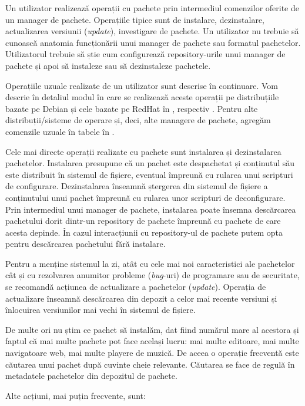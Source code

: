 Un utilizator realizează operații cu pachete prin intermediul comenzilor oferite de un manager de pachete.
Operațiile tipice sunt de instalare, dezinstalare, actualizarea versiunii (\textit{update}), investigare de pachete.
Un utilizator nu trebuie să cunoască anatomia funcționării unui manager de pachete sau formatul pachetelor.
Utilizatorul trebuie să știe cum configurează repository-urile unui manager de pachete și apoi să instaleze sau să dezinstaleze pachetele.

Operațiile uzuale realizate de un utilizator sunt descrise în continuare.
Vom descrie în detaliul modul în care se realizează aceste operații pe distribuțiile bazate pe Debian și cele bazate pe RedHat în , respectiv .
Pentru alte distribuții/sisteme de operare și, deci, alte managere de pachete, agregăm comenzile uzuale în tabele în .

Cele mai directe operații realizate cu pachete sunt instalarea și dezinstalarea pachetelor.
Instalarea presupune că un pachet este despachetat și conținutul său este distribuit în sistemul de fișiere, eventual împreună cu rularea unui scripturi de configurare.
Dezinstalarea înseamnă ștergerea din sistemul de fișiere a conținutului unui pachet împreună cu rularea unor scripturi de deconfigurare.
Prin intermediul unui manager de pachete, instalarea poate însemna descărcarea pachetului dorit dintr-un repository de pachete împreună cu pachete de care acesta depinde.
În cazul interacțiunii cu repository-ul de pachete putem opta pentru descărcarea pachetului fără instalare.

Pentru a menține sistemul la zi, atât cu cele mai noi caracteristici ale pachetelor cât și cu rezolvarea anumitor probleme (\textit{bug}-uri) de programare sau de securitate, se recomandă acțiunea de actualizare a pachetelor (\textit{update}).
Operația de actualizare înseamnă descărcarea din depozit a celor mai recente versiuni și înlocuirea versiunilor mai vechi în sistemul de fișiere.

De multe ori nu știm ce pachet să instalăm, dat fiind numărul mare al acestora și faptul că mai multe pachete pot face același lucru: mai multe editoare, mai multe navigatoare web, mai multe playere de muzică.
De aceea o operație frecventă este căutarea unui pachet după cuvinte cheie relevante.
Căutarea se face de regulă în metadatele pachetelor din depozitul de pachete.

Alte acțiuni, mai puțin frecvente, sunt:

